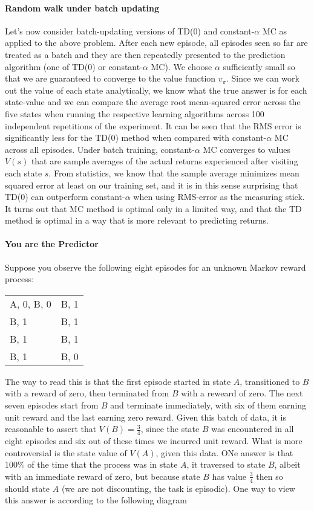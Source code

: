 \documentclass[12pt]{article}
\begin{document}
\paragraph{Random walk under batch updating}
Let's now consider batch-updating versions of TD(0) and constant-$\alpha$ MC as applied to the above problem. After each new episode, all episodes seen so far are treated as a batch and they are then repeatedly presented to the prediction algorithm (one of TD(0) or constant-$\alpha$ MC). We choose $\alpha$ sufficiently small so that we are guaranteed to converge to the value function $v_\pi$. Since we can work out the value of each state analytically, we know what the true answer is for each state-value and we can compare the average root mean-squared error across the five states when running the respective learning algorithms across 100 independent repetitions of the experiment. It can be seen that the RMS error is significantly less for the TD(0) method when compared with constant-$\alpha$ MC across all episodes. Under batch training, constant-$\alpha$ MC converges to values $V(s)$ that are sample averages of the actual returns experienced after visiting each state $s$. From statistics, we know that the sample average minimizes mean squared error at least on our training set, and it is in this sense surprising that TD(0) can outperform constant-$\alpha$ when using RMS-error as the measuring stick. It turns out that MC method is optimal only in a limited way, and that the TD method is optimal in a way that is more relevant to predicting returns.

\paragraph{You are the Predictor} Suppose you observe the following eight episodes for an unknown Markov reward process:

\begin{table}[h]
  \centering
    \begin{tabular}{l l}
    A, 0, B, 0 & B, 1 \\
    B, 1 & B, 1 \\
    B, 1 & B, 1 \\
    B, 1 & B, 0 \\
  \end{tabular}
\end{table}

The way to read this is that the first episode started in state $A$, transitioned to $B$ with a reward of zero, then terminated from $B$ with a reweard of zero. The next seven episodes start from $B$ and terminate immediately, with six of them earning unit reward and the last earning zero reward. Given this batch of data, it is reasonable to assert that $V(B) = \frac{3}{4}$, since the state $B$ was encountered in all eight episodes and six out of these times we incurred unit reward. What is more controversial is the state value of $V(A)$, given this data. ONe answer is that 100\% of the time that the process was in state $A$, it traversed to state $B$, albeit with an immediate reward of zero, but because state $B$ has value $\frac{3}{4}$ then so should state $A$ (we are not discounting, the task is episodic). One way to view this answer is according to the following diagram
\end{document}
